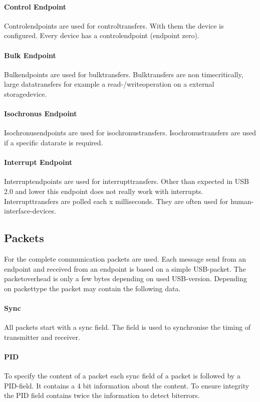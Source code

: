\documentclass{acm_proc_article-sp}
\begin{document}
\paragraph{Control Endpoint}
Controlendpoints are used for controltransfers. With them the device is configured. Every device has a controlendpoint (endpoint zero). \cite{beyond} \cite{wiki2}
\paragraph{Bulk Endpoint}
Bulkendpoints are used for bulktransfers. Bulktransfers are non timecritically, large datatransfers for example a read-/writeoperation on a external storagedevice. \cite{beyond} \cite{wiki2}
\paragraph{Isochronus Endpoint}
Isochronusendpoints are used for isochronustransfers. Isochronustransfers are used if a specific datarate is required. \cite{beyond} \cite{wiki2}
\paragraph{Interrupt Endpoint}
Interruptendpoints are used for interrupttransfers. Other than expected in USB 2.0 and lower this endpoint does not really work with interrupts. Interrupttransfers are polled each x milliseconds. They are often used for human-interface-devices. \cite{beyond} \cite{wiki2}
\subsection{Packets}
For the complete communication packets are used. Each message send from an endpoint and received from an endpoint is based on a simple USB-packet. The packetoverhead is only a few bytes depending on used USB-version. Depending on packettype the packet may contain the following data. \cite{beyond}
\paragraph{Sync}
All packets start with a sync field. The field is used to synchronise the timing of transmitter and receiver. \cite{beyond}
\paragraph{PID}
To specify the content of a packet each sync field of a packet is followed by a PID-field. It contains a 4 bit information about the content. To ensure integrity the PID field contains twice the information to detect biterrors. \cite{beyond}
\end{document}
